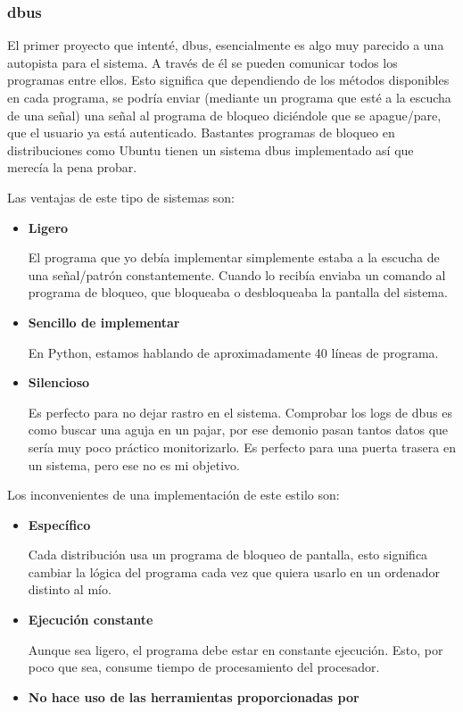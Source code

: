 \documentclass[twoside, titlepage, 12pt, a4paper]{article}
\begin{document}
{\subsubsection{\gls{dbus}}
El primer proyecto que intenté, \gls{dbus}, esencialmente es algo muy parecido a una autopista para el sistema. A través de él se pueden comunicar todos los programas entre ellos. Esto significa que dependiendo de los métodos disponibles en cada programa, se  podría enviar (mediante un programa que esté a la escucha de una señal) una señal al programa de bloqueo diciéndole que se apague/pare, que el usuario ya está autenticado. Bastantes programas de bloqueo en distribuciones como \gls{Ubuntu} tienen un sistema \gls{dbus} implementado así que merecía la pena probar.\par
Las ventajas de este tipo de sistemas son:
\begin{itemize}
	\item{\textbf{Ligero}}\par
		El programa que yo debía implementar simplemente estaba a la escucha de una señal/patrón constantemente. Cuando lo recibía enviaba un comando al programa de bloqueo, que bloqueaba o desbloqueaba la pantalla del sistema. 
	\item{\textbf{Sencillo de implementar}}\par
		En Python, estamos hablando de aproximadamente 40 líneas de programa.
	\item{\textbf{Silencioso}}\par
		Es perfecto para no dejar rastro en el sistema. Comprobar los logs de \gls{dbus} es como buscar una aguja en un pajar, por ese demonio pasan tantos datos que sería muy poco práctico monitorizarlo. Es perfecto para una puerta trasera en un sistema, pero ese no es mi objetivo.
\end{itemize}
Los inconvenientes de una implementación de este estilo son:
\begin{itemize}
	\item{\textbf{Específico}}\par
		Cada distribución usa un programa de bloqueo de pantalla, esto significa cambiar la lógica del programa cada vez que quiera usarlo en un ordenador distinto al mío.
	\item{\textbf{Ejecución constante}}\par
		Aunque sea ligero, el programa debe estar en constante ejecución. Esto, por poco que sea, consume tiempo de procesamiento del procesador.
	\item{\textbf{No hace uso de las herramientas proporcionadas por }\par
}
\end{itemize}}
\end{document}
